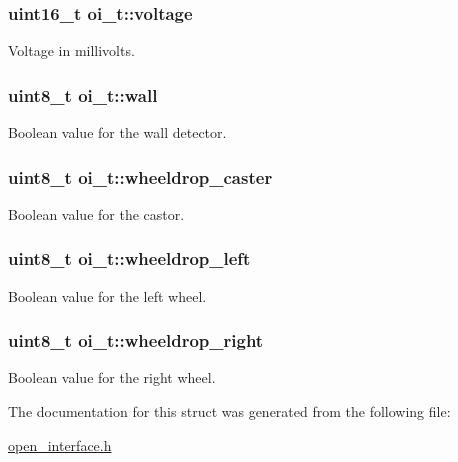 \hypertarget{structoi__t_ab69770425f311cab427fb07caef36bc6}{
\subsubsection[{voltage}]{\setlength{\rightskip}{0pt plus 5cm}uint16\_\-t {\bf oi\_\-t::voltage}}}
\label{structoi__t_ab69770425f311cab427fb07caef36bc6}


Voltage in millivolts. 

\hypertarget{structoi__t_a1c9eafae94e169cf9a672af28619c4e6}{
\subsubsection[{wall}]{\setlength{\rightskip}{0pt plus 5cm}uint8\_\-t {\bf oi\_\-t::wall}}}
\label{structoi__t_a1c9eafae94e169cf9a672af28619c4e6}


Boolean value for the wall detector. 

\hypertarget{structoi__t_aa96535c384d724257df251e40583a1e8}{
\subsubsection[{wheeldrop\_\-caster}]{\setlength{\rightskip}{0pt plus 5cm}uint8\_\-t {\bf oi\_\-t::wheeldrop\_\-caster}}}
\label{structoi__t_aa96535c384d724257df251e40583a1e8}


Boolean value for the castor. 

\hypertarget{structoi__t_a0c3dbabeacf8660420721fb2340caac6}{
\subsubsection[{wheeldrop\_\-left}]{\setlength{\rightskip}{0pt plus 5cm}uint8\_\-t {\bf oi\_\-t::wheeldrop\_\-left}}}
\label{structoi__t_a0c3dbabeacf8660420721fb2340caac6}


Boolean value for the left wheel. 

\hypertarget{structoi__t_ad9d421a68ea9d5432c154aed2e23900a}{
\subsubsection[{wheeldrop\_\-right}]{\setlength{\rightskip}{0pt plus 5cm}uint8\_\-t {\bf oi\_\-t::wheeldrop\_\-right}}}
\label{structoi__t_ad9d421a68ea9d5432c154aed2e23900a}


Boolean value for the right wheel. 



The documentation for this struct was generated from the following file:\begin{DoxyCompactItemize}
\item 
\hyperlink{open__interface_8h}{open\_\-interface.h}\end{DoxyCompactItemize}
